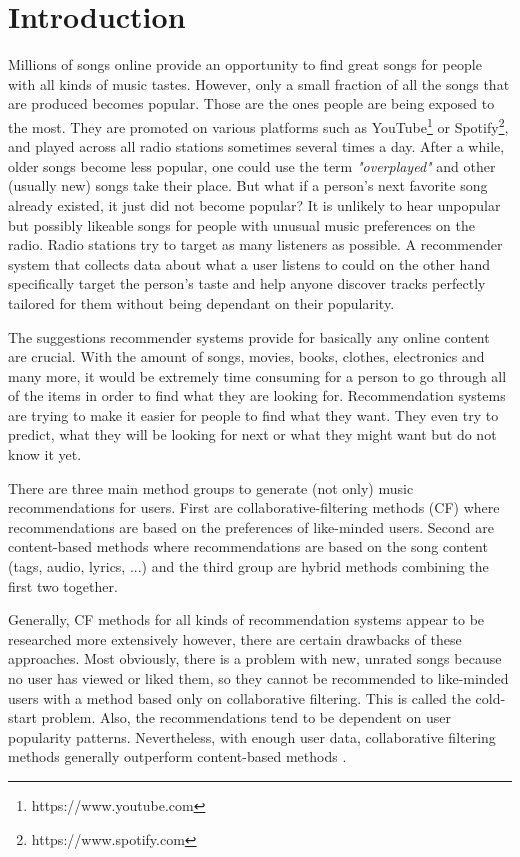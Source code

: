 \chapter*{Introduction}

Millions of songs online provide an opportunity to find great songs for people with all kinds of music tastes. However, only a small fraction of all the songs that are produced becomes popular. Those are the ones people are being exposed to the most. They are promoted on various platforms such as YouTube\footnote{https://www.youtube.com} or Spotify\footnote{https://www.spotify.com}, and played across all radio stations sometimes several times a day. After a while, older songs become less popular, one could use the term \textit{"overplayed"} and other (usually new) songs take their place. But what if a person's next favorite song already existed, it just did not become popular? It is unlikely to hear unpopular but possibly likeable songs for people with unusual music preferences on the radio. Radio stations try to target as many listeners as possible. A recommender system that collects data about what a user listens to could on the other hand specifically target the person's taste and help anyone discover tracks perfectly tailored for them without being dependant on their popularity.

The suggestions recommender systems provide for basically any online content are crucial. With the amount of songs, movies, books, clothes, electronics and many more, it would be extremely time consuming for a person to go through all of the items in order to find what they are looking for. Recommendation systems are trying to make it easier for people to find what they want. They even try to predict, what they will be looking for next or what they might want but do not know it yet. 

There are three main method groups to generate (not only) music recommendations for users. First are collaborative-filtering methods (CF) where recommendations are based on the preferences of like-minded users. Second are content-based methods where recommendations are based on the song content (tags, audio, lyrics, ...) and the third group are hybrid methods combining the first two together. 

Generally, CF methods for all kinds of recommendation systems appear to be researched more extensively \cite{DBLP:journals/corr/abs-1712-07525} however, there are certain drawbacks of these approaches. Most obviously, there is a problem with new, unrated songs because no user has viewed or liked them, so they cannot be recommended to like-minded users with a method based only on collaborative filtering. This is called the cold-start problem. Also, the recommendations tend to be dependent on user popularity patterns. Nevertheless, with enough user data, collaborative filtering methods generally outperform content-based methods \cite{van2013deep}. 

